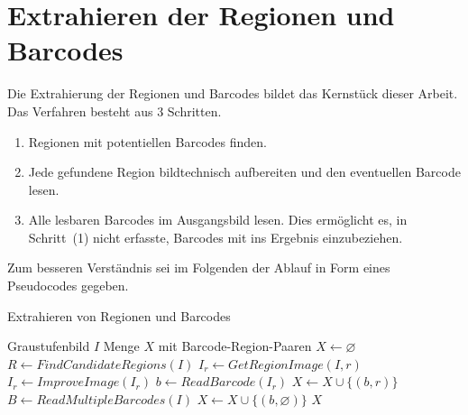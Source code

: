 \section{Extrahieren der Regionen und Barcodes}
\label{sec:extraction}
\writtenby{\dcauthornameewie}%
%
Die Extrahierung der Regionen und Barcodes bildet das Kernstück dieser Arbeit.
Das Verfahren besteht aus 3 Schritten.
%
\begin{enumerate}[(1)]
\item Regionen mit potentiellen Barcodes finden.
\item Jede gefundene Region bildtechnisch aufbereiten und den eventuellen Barcode lesen.
\item Alle lesbaren Barcodes im Ausgangsbild lesen.
Dies ermöglicht es, in Schritt~(1) nicht erfasste, Barcodes mit ins Ergebnis einzubeziehen.
\end{enumerate}
%
Zum besseren Verständnis sei im Folgenden der Ablauf in Form eines Pseudocodes gegeben.
%
\begin{algorithm}
\caption{Extrahieren von Regionen und Barcodes}
\begin{algorithmic}
\Require Graustufenbild $I$
\Ensure Menge $X$ mit Barcode-Region-Paaren
\State $X\gets\varnothing$
\State $R\gets FindCandidateRegions(I)$
  \State $I_r\gets GetRegionImage(I,r)$
  \State $I_r\gets ImproveImage(I_r)$
  \State $b\gets ReadBarcode(I_r)$
  \State $X\gets X\cup \{(b,r)\}$
\EndFor
\State $B\gets ReadMultipleBarcodes(I)$
    \State $X\gets X\cup \{(b,\varnothing)\}$
  \EndIf
\EndFor
\State\Return $X$
\end{algorithmic}
\end{algorithm}

